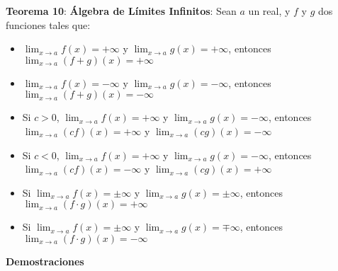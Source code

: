 \documentclass[11pt,a4paper]{article}
\begin{document}
\noindent \textbf{Teorema 10}: \textbf{\'Algebra de L\'imites Infinitos}: Sean $a$ un real, y $f$ y $g$ dos funciones tales que:
\begin{itemize}
\item $\displaystyle{\lim_{x \to a} f(x) = +\infty}$ y $\displaystyle{\lim_{x \to a} g(x) = +\infty}$, entonces $\displaystyle{\lim_{x \to a} (f+g)(x) = +\infty}$
\item $\displaystyle{\lim_{x \to a} f(x) = -\infty}$ y $\displaystyle{\lim_{x \to a} g(x) = -\infty}$, entonces $\displaystyle{\lim_{x \to a} (f+g)(x) = -\infty}$
\item Si $c>0$, $\displaystyle{\lim_{x \to a} f(x) = +\infty}$ y $\displaystyle{\lim_{x \to a} g(x) = -\infty}$, entonces $\displaystyle{\lim_{x \to a} (cf)(x) = +\infty}$ y $\displaystyle{\lim_{x \to a} (cg)(x) = -\infty}$
\item Si $c<0$, $\displaystyle{\lim_{x \to a} f(x) = +\infty}$ y $\displaystyle{\lim_{x \to a} g(x) = -\infty}$, entonces $\displaystyle{\lim_{x \to a} (cf)(x) = -\infty}$ y $\displaystyle{\lim_{x \to a} (cg)(x) = +\infty}$
\item Si $\displaystyle{\lim_{x \to a} f(x) = \pm \infty}$ y $\displaystyle{\lim_{x \to a} g(x) = \pm \infty}$, entonces $\displaystyle{\lim_{x \to a} (f\cdot g)(x) = + \infty}$
\item Si $\displaystyle{\lim_{x \to a} f(x) = \pm \infty}$ y $\displaystyle{\lim_{x \to a} g(x) = \mp \infty}$, entonces $\displaystyle{\lim_{x \to a} (f\cdot g)(x) = - \infty}$
\end{itemize}
\newpage
\textbf{Demostraciones}
\end{document}
